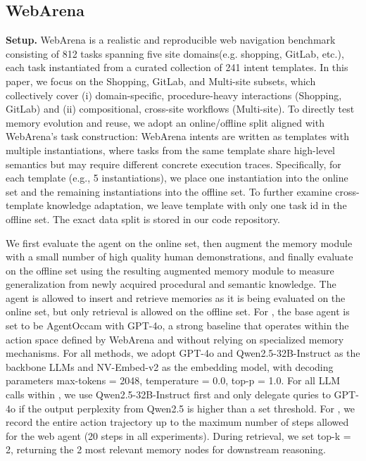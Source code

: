 \subsection{WebArena}
\label{app:webarena_details}
\textbf{Setup.} WebArena \cite{zhou2024webarenarealisticwebenvironment} is a realistic and reproducible web navigation benchmark consisting of 812 tasks spanning five site domains(e.g. shopping, GitLab, etc.), each task instantiated from a curated collection of 241 intent templates. In this paper, we focus on the Shopping, GitLab, and Multi-site subsets, which collectively cover (i) domain-specific, procedure-heavy interactions (Shopping, GitLab) and (ii) compositional, cross-site workflows (Multi-site). To directly test memory evolution and reuse, we adopt an online/offline split aligned with WebArena’s task construction: WebArena intents are written as templates with multiple instantiations, where tasks from the same template share high-level semantics but may require different concrete execution traces. Specifically, for each template (e.g., 5 instantiations), we place one instantiation into the online set and the remaining instantiations into the offline set. To further examine cross-template knowledge adaptation, we leave template with only one task id in the offline set. The exact data split is stored in our code repository.

We first evaluate the agent on the online set, then augment the memory module with a small number of high quality human demonstrations, and finally evaluate on the offline set using the resulting augmented memory module to measure generalization from newly acquired procedural and semantic knowledge. The agent is allowed to insert and retrieve memories as it is being evaluated on the online set, but only retrieval is allowed on the offline set. For \plugmem, the base agent is set to be AgentOccam \cite{yang2025agentoccamsimplestrongbaseline} with GPT-4o, a strong baseline that operates within the action space defined by WebArena and without relying on specialized memory mechanisms. For all methods, we adopt GPT-4o and Qwen2.5-32B-Instruct \citep{qwen2025qwen25technicalreport} as the backbone LLMs and NV-Embed-v2 \citep{lee2025nvembedimprovedtechniquestraining} as the embedding model, with decoding parameters max-tokens = 2048, temperature = 0.0, top-p = 1.0. For all LLM calls within \plugmem, we use Qwen2.5-32B-Instruct first and only delegate quries to GPT-4o if the output perplexity from Qwen2.5 is higher than a set threshold. For \plugmem, we record the entire action trajectory up to the maximum number of steps allowed for the web agent (20 steps in all experiments). During retrieval, we set top-k = 2, returning the 2 most relevant memory nodes for downstream reasoning.

